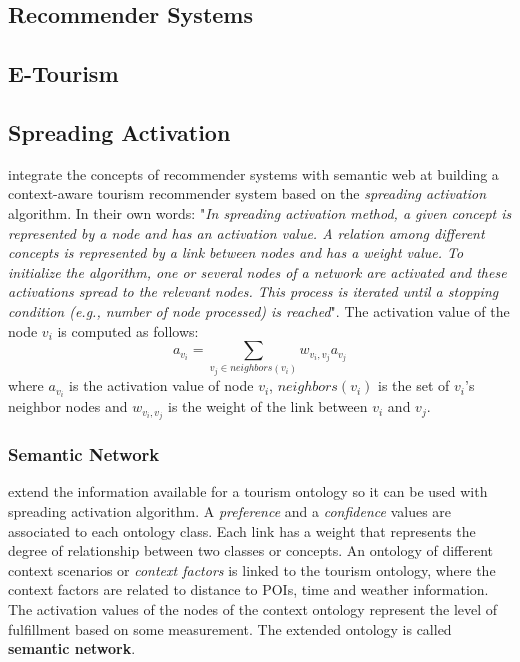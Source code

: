 \subsection{Recommender Systems}
\subsection{E-Tourism}
\subsection{Spreading Activation}
\cite{bahramian_abbaspour_claramunt_2017} integrate the concepts of recommender systems with semantic web at building a context-aware tourism recommender system based on the \textit{spreading activation} algorithm. In their own words: "\textit{In spreading activation method, a given concept is represented by a node and has an activation value. A relation among different concepts is represented by a link between nodes and has a weight value. To initialize the algorithm, one or several nodes of a network are activated and these activations spread to the relevant nodes. This process is iterated until a stopping condition (e.g., number of node processed) is reached}". The activation value of the node \(v_i\) is computed as follows:
\begin{equation} \label{eq:og_activation}
a_{v_i} = \sum_{v_j \in neighbors(v_i)} w_{v_i, v_j} a_{v_j} 
\end{equation}
where $a_{v_i}$ is the activation value of node $v_i$, $neighbors(v_i)$ is the set of $v_i$'s neighbor nodes and $w_{v_i, v_j}$ is the weight of the link between $v_i$ and $v_j$.

\subsubsection{Semantic Network}
\cite{bahramian_abbaspour_claramunt_2017} extend the information available for a tourism ontology so it can be used with spreading activation algorithm. A \textit{preference} and a \textit{confidence} values are associated to each ontology class. Each link has a weight that represents the degree of relationship between two classes or concepts. An ontology of different context scenarios or \textit{context factors} is linked to the tourism ontology, where the context factors are related to distance to POIs, time and weather information. The activation values of the nodes of the context ontology represent the level of fulfillment based on some measurement. The extended ontology is called \textbf{semantic network}.

